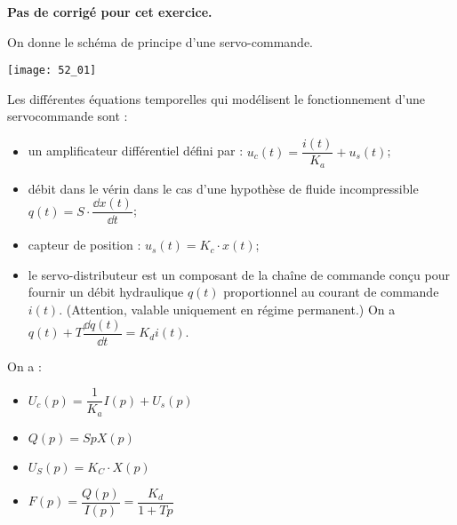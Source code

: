 \normaltrue \difficilefalse \tdifficilefalse
\correctionfalse


\setcounter{question}{0}
\ifcorrection
\else
\textbf{Pas de corrigé pour cet exercice.}
\fi


\ifprof 
\else
On donne le schéma de principe d'une servo-commande.
\begin{center}
\texttt{[image: 52\_01]}
\end{center}

Les différentes équations temporelles qui modélisent le fonctionnement d'une servocommande sont :
\begin{itemize}
\item un amplificateur différentiel défini par : $u_c(t)=\dfrac{i(t)}{K_a}+u_s(t)$;
\item débit dans le vérin dans le cas d'une hypothèse de fluide incompressible $q(t)=S\cdot\dfrac{\dd x(t)}{\dd t}$;
\item capteur de position : $u_s(t)=K_c\cdot x(t)$;
\item le servo-distributeur est un composant de la chaîne de commande conçu pour fournir un débit hydraulique $q(t)$ proportionnel au courant de commande $i(t)$. (Attention, valable uniquement en régime permanent.) On a 
$q(t)+T \dfrac{\dd q(t)}{\dd t} = K_d i(t)$.
\end{itemize}
 \fi
 

\ifprof
On a :
\begin{itemize}
\item $U_c(p)=\dfrac{1}{K_a}I(p)+U_s(p)$
\item $Q(p)=SpX(p)$
\item $U_S(p)=K_C\cdot X(p)$
\item $F(p)=\dfrac{Q(p)}{I(p)}=\dfrac{K_d}{1+Tp}$
\end{itemize}

